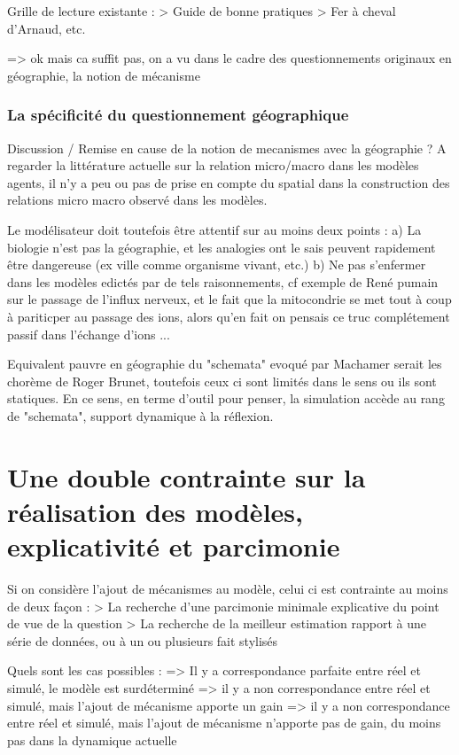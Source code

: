 Grille de lecture existante : 
> Guide de bonne pratiques
> Fer à cheval d'Arnaud, etc.

=> ok mais ca suffit pas, on a vu dans le cadre des questionnements originaux en géographie, la notion de mécanisme

\subsubsection{La spécificité du questionnement géographique}

Discussion / Remise en cause de la notion de mecanismes avec la géographie ? 
A regarder la littérature actuelle sur la relation micro/macro dans les modèles agents, il n'y a peu ou pas de prise en compte du spatial dans la construction des relations micro macro observé dans les modèles.

Le modélisateur doit toutefois être attentif sur au moins deux points : 
 a) La biologie n'est pas la géographie, et les analogies ont le sais peuvent rapidement être dangereuse (ex ville comme organisme vivant, etc.)
 b) Ne pas s'enfermer dans les modèles edictés par de tels raisonnements, cf exemple de René pumain sur le passage de l'influx nerveux, et le fait que la mitocondrie se met tout à coup à pariticper au passage des ions, alors qu'en fait on pensais ce truc complétement passif dans l'échange d'ions ... 

Equivalent pauvre en géographie du "schemata" evoqué par Machamer serait les chorème de Roger Brunet, toutefois ceux ci sont limités dans le sens ou ils sont statiques. En ce sens, en terme d'outil pour penser, la simulation accède au rang de "schemata", support dynamique à la réflexion.

\section{Une double contrainte sur la réalisation des modèles, explicativité et parcimonie}

Si on considère l'ajout de mécanismes au modèle, celui ci est contrainte au moins de deux façon : 
> La recherche d'une parcimonie minimale explicative du point de vue de la question
> La recherche de la meilleur estimation rapport à une série de données, ou à un ou plusieurs fait stylisés

Quels sont les cas possibles :
=> Il y a correspondance parfaite entre réel et simulé, le modèle est surdéterminé
=> il y a non correspondance entre réel et simulé, mais l'ajout de mécanisme apporte un gain
=> il y a non correspondance entre réel et simulé, mais l'ajout de mécanisme n'apporte pas de gain, du moins pas dans la dynamique actuelle

